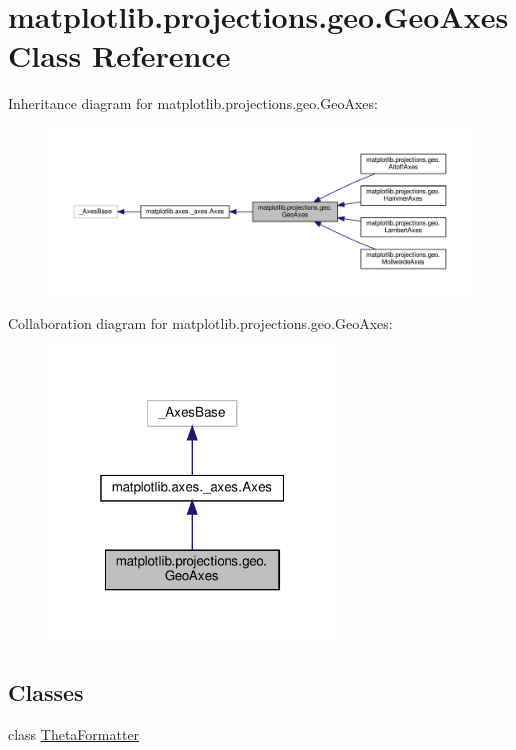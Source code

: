 \hypertarget{classmatplotlib_1_1projections_1_1geo_1_1GeoAxes}{}\section{matplotlib.\+projections.\+geo.\+Geo\+Axes Class Reference}
\label{classmatplotlib_1_1projections_1_1geo_1_1GeoAxes}


Inheritance diagram for matplotlib.\+projections.\+geo.\+Geo\+Axes\+:
\nopagebreak
\begin{figure}[H]
\begin{center}
\leavevmode
\includegraphics[width=350pt]{classmatplotlib_1_1projections_1_1geo_1_1GeoAxes__inherit__graph}
\end{center}
\end{figure}


Collaboration diagram for matplotlib.\+projections.\+geo.\+Geo\+Axes\+:
\nopagebreak
\begin{figure}[H]
\begin{center}
\leavevmode
\includegraphics[width=217pt]{classmatplotlib_1_1projections_1_1geo_1_1GeoAxes__coll__graph}
\end{center}
\end{figure}
\subsection*{Classes}
\begin{DoxyCompactItemize}
\item 
class \hyperlink{classmatplotlib_1_1projections_1_1geo_1_1GeoAxes_1_1ThetaFormatter}{Theta\+Formatter}
\end{DoxyCompactItemize}
